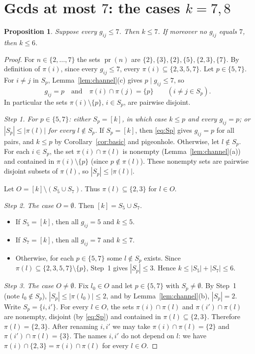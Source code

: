 \documentclass[11pt]{article}
\newtheorem{proposition}[theorem]{Proposition}
\theoremstyle{remark}
\theoremstyle{definition}
\newcommand{\pr}{\operatorname{pr}}
\begin{document}
\section{Gcds at most $7$: the cases $k=7,8$}

\begin{proposition}\label{prop:78}
Suppose every $g_{ij}\le7$. Then $k\le7$. If moreover no $g_{ij}$ equals $7$, then $k\le6$.
\end{proposition}

\begin{proof}
For $n\in\{2,\dots,7\}$ the sets $\pr(n)$ are $\{2\},\{3\},\{2\},\{5\},\{2,3\},\{7\}$. By
definition of $\pi(i)$, since every $g_{ij}\le7$, every $\pi(i)\subseteq\{2,3,5,7\}$. Let $p\in\{5,7\}$. For $i\ne j$ in $S_p$,
Lemma~\ref{lem:channel}(c) gives $p\mid g_{ij}\le7$, so
\begin{equation}\label{eq:Sp}
  g_{ij}=p\quad\text{and}\quad\pi(i)\cap\pi(j)=\{p\}\qquad(i\ne j\in S_p).
\end{equation}
In particular the sets $\pi(i)\setminus\{p\}$, $i\in S_p$, are pairwise disjoint.

\emph{Step 1. For $p\in\{5,7\}$: either $S_p=[k]$, in which case $k\le p$ and every $g_{ij}=p$; or
$|S_p|\le|\pi(l)|$ for every $l\notin S_p$.}
If $S_p=[k]$, then \eqref{eq:Sp} gives $g_{ij}=p$ for all pairs, and $k\le p$ by
Corollary~\ref{cor:basic} and pigeonhole. Otherwise, let $l\notin S_p$. For each $i\in S_p$, the set
$\pi(i)\cap\pi(l)$ is nonempty (Lemma~\ref{lem:channel}(a)) and contained in $\pi(i)\setminus\{p\}$
(since $p\notin\pi(l)$). These nonempty sets are pairwise disjoint subsets of $\pi(l)$, so
$|S_p|\le|\pi(l)|$.

Let $O=[k]\setminus(S_5\cup S_7)$. Thus $\pi(l)\subseteq\{2,3\}$ for $l\in O$.

\emph{Step 2. The case $O=\emptyset$.} Then $[k]=S_5\cup S_7$.
\begin{itemize}
\item If $S_5=[k]$, then all $g_{ij}=5$ and $k\le5$.
\item If $S_7=[k]$, then all $g_{ij}=7$ and $k\le7$.
\item Otherwise, for each $p\in\{5,7\}$ some $l\notin S_p$ exists. Since $\pi(l)\subseteq\{2,3,5,7\}\setminus\{p\}$,
  Step~1 gives $|S_p|\le3$. Hence $k\le|S_5|+|S_7|\le6$.
\end{itemize}

\emph{Step 3. The case $O\ne\emptyset$.} Fix $l_0\in O$ and let $p\in\{5,7\}$ with $S_p\ne\emptyset$.
By Step~1 (note $l_0\notin S_p$), $|S_p|\le|\pi(l_0)|\le2$, and by Lemma~\ref{lem:channel}(b),
$|S_p|=2$. Write $S_p=\{i,i'\}$. For every $l\in O$, the sets $\pi(i)\cap\pi(l)$ and $\pi(i')\cap\pi(l)$
are nonempty, disjoint (by \eqref{eq:Sp}) and contained in $\pi(l)\subseteq\{2,3\}$. Therefore
$\pi(l)=\{2,3\}$. After renaming $i,i'$ we may take $\pi(i)\cap\pi(l)=\{2\}$ and $\pi(i')\cap\pi(l)=\{3\}$.
The names $i,i'$ do not depend on $l$: we have $\pi(i)\cap\{2,3\}=\pi(i)\cap\pi(l)$ for every
$l\in O$.


\end{proof}
\end{document}
